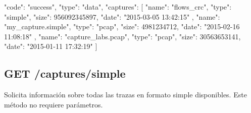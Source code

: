 \begin{itemize}
{\begin{minipage}{\textwidth}
\begin{code}[language=json]
{
  "code": "success",
  "type": "data",
  "captures": [
    {
      "name": "flows_crc",
      "type": "simple",
      "size": 956092345897,
      "date": "2015-03-05 13:42:15"
    },
    {
      "name": "my_capture.simple",
      "type": "pcap",
      "size": 4981234712,
      "date": "2015-02-16 11:08:18"
    },
    {
      "name": "capture_labs.pcap",
      "type": "pcap",
      "size": 30563653141,
      "date": "2015-01-11 17:32:19"
    }
  ]
}
\end{code}
\end{minipage}
}

\end{itemize}

%
%
\subsection{GET /captures/simple}
Solicita información sobre todas las \glspl{traza} en formato \gls{simple} disponibles.
Este método no requiere parámetros.

